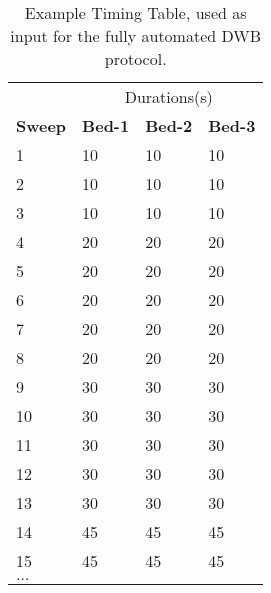 \begin{table}[ht!]
\centering
\label{tab:TimmingTable}
\caption{Example Timing Table, used as input for the fully automated DWB protocol.}
\begin{tabular}{|l|l|l|l|}
\toprule
\textbf{} & \multicolumn{3}{c|}{Durations(s)} \\ 
\textbf{Sweep} & \textbf{Bed-1} & \textbf{Bed-2} & \textbf{Bed-3} \\
\midrule
1     & 10    & 10   & 10    \\
2     & 10    & 10                        & 10    \\
3     & 10    & 10                        & 10    \\
4     & 20    & 20                        & 20    \\
5     & 20    & 20                        & 20    \\
6     & 20    & 20                        & 20    \\
7     & 20    & 20                        & 20    \\
8     & 20    & 20                        & 20    \\
9     & 30    & 30                        & 30    \\
10    & 30    & 30                        & 30    \\
11    & 30    & 30                        & 30    \\
12    & 30    & 30                        & 30    \\
13    & 30    & 30                        & 30    \\
14    & 45    & 45                        & 45    \\
15    & 45    & 45                        & 45    \\
\multicolumn{4}{|l|}{$\dots$} \\
\bottomrule
\end{tabular}
\end{table}




